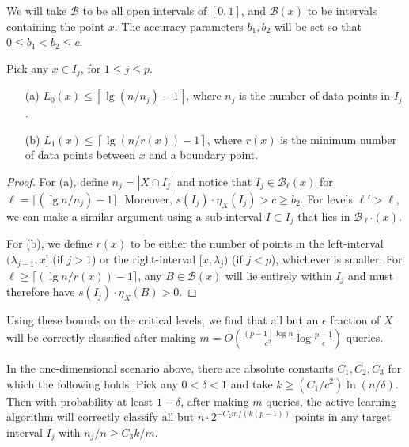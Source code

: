 \documentclass[anon,12pt]{colt2022} %
\def\B{{\mathcal B}}
\begin{document}
We will take $\B$ to be all open intervals of $[0,1]$, and $\B(x)$ to be intervals containing the point $x$. The accuracy parameters $b_1, b_2$ will be set so that $0 \leq b_1 < b_2 \leq c$.
\begin{lemma}
Pick any $x \in I_j$, for $1 \leq j \leq p$.
\begin{enumerate}
\item[(a)] $L_0(x) \leq \left\lceil \lg (n/n_j) - 1 \right\rceil$, where $n_j$ is the number of data points in $I_j$.
\item[(b)] $L_1(x) \leq \left\lceil \lg (n/r(x)) - 1 \right\rceil$, where $r(x)$ is the minimum number of data points between $x$ and a boundary point. 
\end{enumerate}
\label{lemma:critical-one-d-massart}
\end{lemma}
\begin{proof}
For (a), define $n_j = |X \cap I_j|$ and notice that $I_j \in \B_{\ell}(x)$ for $\ell = \lceil (\lg n/n_j) - 1 \rceil$. Moreover, $s(I_j) \cdot \eta_X(I_j) > c \geq b_2$. For levels $\ell' > \ell$, we can make a similar argument using a sub-interval $I \subset I_j$ that lies in $\B_{\ell'}(x)$.

For (b), we define $r(x)$ to be either the number of points in the left-interval $(\lambda_{j-1},x]$ (if $j > 1$) or the right-interval $[x, \lambda_j)$ (if $j < p$), whichever is smaller. For $\ell \geq \lceil (\lg n/r(x)) - 1 \rceil$, any $B \in \B(x)$ will lie entirely within $I_j$ and must therefore have $s(I_j) \cdot \eta_X(B) > 0$.
\end{proof}

Using these bounds on the critical levels, we find that all but an $\epsilon$ fraction of $X$ will be correctly classified after making $m = O(\frac{(p-1)\log n}{c^2} \log \frac{p-1}{\epsilon})$ queries.
\begin{theorem}
In the one-dimensional scenario above, there are absolute constants $C_1, C_2, C_3$ for which the following holds. Pick any $0 < \delta < 1$ and take $k \geq (C_1/c^2) \ln (n/\delta)$. Then with probability at least $1-\delta$, after making $m$ queries, the active learning algorithm will correctly classify all but $n \cdot 2^{-C_2 m/(k(p-1))}$ points in any target interval $I_j$ with $n_j/n \geq C_3 k/m$.
\label{thm:one-d-massart}
\end{theorem}
\end{document}
